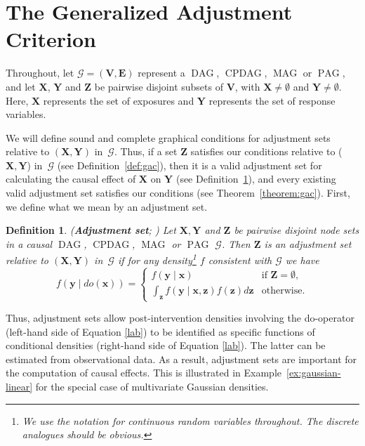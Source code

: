 \documentclass[11pt,a4paper]{article}
\newtheorem{definition}{Definition}
\DeclareMathOperator{\CPDAG}{CPDAG}
\DeclareMathOperator{\DAG}{DAG}
\DeclareMathOperator{\MAG}{MAG}
\DeclareMathOperator{\PAG}{PAG}
\newcommand{\vars}[1][V]{\mathbf{#1}}
\newcommand{\e}[1][E]{\mathbf{#1}}
\newcommand{\g}[1][G]{\mathcal{#1}}
\begin{document}
\section{The Generalized Adjustment Criterion} \label{sec:main}

Throughout, let $\g=(\vars,\e)$ represent a $\DAG$, $\CPDAG$, $\MAG$ or $\PAG$, and let $\mathbf{X}$, $\mathbf{Y}$ and $\mathbf{Z}$ be pairwise disjoint subsets of $\vars$, with $\mathbf{X}\neq \emptyset$ and $\mathbf{Y}\neq \emptyset$. Here, $\mathbf{X}$ represents the set of exposures and $\mathbf{Y}$ represents the set of response variables. 

We will define sound and complete graphical conditions for adjustment sets relative to $(\mathbf{X,Y})$ in~$\g$. Thus, if a set $\mathbf{Z}$ satisfies our conditions  relative to ($\mathbf{X},\mathbf{Y}$) in~$\g$ (see Definition~\ref{def:gac}), then it is a valid adjustment set for calculating the causal effect of $\mathbf{X}$ on $\mathbf{Y}$ (see Definition~\ref{defadjustment}), and every existing valid adjustment set satisfies our conditions (see Theorem~\ref{theorem:gac}).
First, we define what we mean by an adjustment set.
\begin{definition}{(\textbf{Adjustment set}; \citealp{maathuis2013generalized})}
   Let $\mathbf{X,Y}$ and $\mathbf{Z}$ be pairwise disjoint node sets in a causal $\DAG$, $\CPDAG$, $\MAG$ or $\PAG$ $\g$. Then $\mathbf{Z}$ is an adjustment set relative to $(\mathbf{X,Y})$ in~$\g$  if for any density\footnote{We use the notation for continuous random variables throughout. The discrete analogues should be obvious.} $f$ consistent with $\g$ we have
   \begin{equation}
   f(\mathbf{y}\mid do(\mathbf{x}))=
   \begin{cases}
   f(\mathbf{y}\mid\mathbf{x}) & \text{if }\mathbf{Z} = \emptyset,\\
   \int_{\mathbf{z}}f(\mathbf{y}\mid\mathbf{x,z})f(\mathbf{z})d\mathbf{z}  & \text{otherwise.}
   \end{cases}
   \label{lab}
   \end{equation}
   \label{defadjustment}
\end{definition}
\noindent{}Thus, adjustment sets allow post-intervention densities involving the do-operator (left-hand side of Equation \ref{lab}) 
to be identified as specific functions of conditional densities (right-hand side of Equation \ref{lab}). The latter can be estimated from observational data. As a result, adjustment sets are important for the computation of causal effects. This is illustrated in Example~\ref{ex:gaussian-linear} for the special case of multivariate Gaussian densities.
\end{document}
